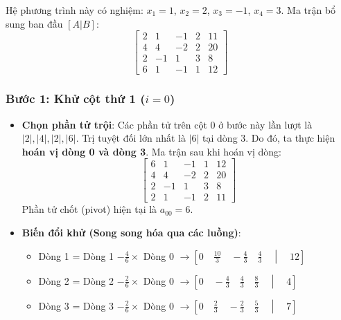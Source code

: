 Hệ phương trình này có nghiệm: $x_1 = 1$, $x_2 = 2$, $x_3 = -1$, $x_4 = 3$.
Ma trận bổ sung ban đầu $[A|B]$:
\begin{equation*}
    \left[ \begin{array}{cccc|c}
            2 & 1  & -1 & 2 & 11 \\
            4 & 4  & -2 & 2 & 20 \\
            2 & -1 & 1  & 3 & 8  \\
            6 & 1  & -1 & 1 & 12
        \end{array} \right]
\end{equation*}

\subsubsection*{Bước 1: Khử cột thứ 1 ($i = 0$)}
\begin{itemize}
    \item \textbf{Chọn phần tử trội}: Các phần tử trên cột 0 ở bước này lần lượt là $|2|, |4|, |2|, |6|$. Trị tuyệt đối lớn nhất là $|6|$ tại dòng 3. Do đó, ta thực hiện \textbf{hoán vị dòng 0 và dòng 3}.
          Ma trận sau khi hoán vị dòng:
          \begin{equation*}
              \left[ \begin{array}{cccc|c}
                      6 & 1  & -1 & 1 & 12 \\
                      4 & 4  & -2 & 2 & 20 \\
                      2 & -1 & 1  & 3 & 8  \\
                      2 & 1  & -1 & 2 & 11
                  \end{array} \right]
          \end{equation*}
          Phần tử chốt (pivot) hiện tại là $a_{00} = 6$.
    \item \textbf{Biến đổi khử (Song song hóa qua các luồng)}:
          \begin{itemize}
              \item Dòng 1 = Dòng 1 $- \frac{4}{6} \times$ Dòng 0 $\to \left[0 \quad \frac{10}{3} \quad -\frac{4}{3} \quad \frac{4}{3} \quad \middle| \quad 12\right]$
              \item Dòng 2 = Dòng 2 $- \frac{2}{6} \times$ Dòng 0 $\to \left[0 \quad -\frac{4}{3} \quad \frac{4}{3} \quad \frac{8}{3} \quad \middle| \quad 4\right]$
              \item Dòng 3 = Dòng 3 $- \frac{2}{6} \times$ Dòng 0 $\to \left[0 \quad \frac{2}{3} \quad -\frac{2}{3} \quad \frac{5}{3} \quad \middle| \quad 7\right]$
          \end{itemize}
\end{itemize}
